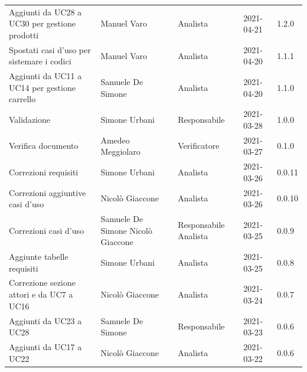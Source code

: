 \documentclass[a4paper]{article}
\begin{document}
\begin{center}
\begin{longtable}[!h]{p{160px} p{90px} p{60px} p{60px} p{50px}}
        Aggiunti da UC28 a UC30 per gestione prodotti            & Manuel Varo                                & Analista                       & 2021-04-21    & 1.2.0             \\
        Spostati casi d'uso per sistemare i codici               & Manuel Varo                                & Analista                       & 2021-04-20    & 1.1.1             \\
        Aggiunti da UC11 a UC14 per gestione carrello            & Samuele De Simone                          & Analista                       & 2021-04-20    & 1.1.0             \\
        Validazione                                              & Simone Urbani                              & Responsabile                   & 2021-03-28    & 1.0.0             \\
        Verifica documento                                       & Amedeo Meggiolaro                          & Verificatore                   & 2021-03-27    & 0.1.0             \\
        Correzioni requisiti                                     & Simone Urbani                              & Analista                       & 2021-03-26    & 0.0.11            \\
        Correzioni aggiuntive casi d'uso                         & Nicolò Giaccone                            & Analista                       & 2021-03-26    & 0.0.10            \\
        Correzioni casi d'uso                                    & Samuele De Simone \newline Nicolò Giaccone & Responsabile \newline Analista & 2021-03-25    & 0.0.9             \\
        Aggiunte tabelle requisiti                               & Simone Urbani                              & Analista                       & 2021-03-25    & 0.0.8             \\
        Correzione sezione attori e da UC7 a UC16                & Nicolò Giaccone                            & Analista                       & 2021-03-24    & 0.0.7             \\
        Aggiunti da UC23 a UC28                                  & Samuele De Simone                          & Responsabile                   & 2021-03-23    & 0.0.6             \\
        Aggiunti da UC17 a UC22                                  & Nicolò Giaccone                            & Analista                       & 2021-03-22    & 0.0.6             \\

\end{longtable}
\end{center}
\end{document}
